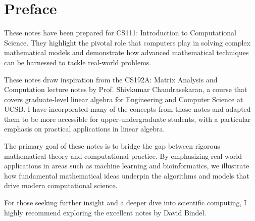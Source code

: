 \newpage
\section*{Preface}

\vskip 5mm
These notes have been prepared for CS111: Introduction to Computational Science. They highlight the pivotal role that computers play in solving complex mathematical models and demonstrate how advanced mathematical techniques can be harnessed to tackle real-world problems.

\vskip 5mm
These notes draw inspiration from the CS192A: Matrix Analysis and Computation lecture notes by Prof. Shivkumar Chandrasekaran, a course that covers graduate-level linear algebra for Engineering and Computer Science at UCSB. I have incorporated many of the concepts from those notes and adapted them to be more accessible for upper-undergraduate students, with a particular emphasis on practical applications in linear algebra.

\vskip 5mm
The primary goal of these notes is to bridge the gap between rigorous mathematical theory and computational practice. By emphasizing real-world applications in areas such as machine learning and bioinformatics, we illustrate how fundamental mathematical ideas underpin the algorithms and models that drive modern computational science.

\vskip 5mm
For those seeking further insight and a deeper dive into scientific computing, I highly recommend exploring the excellent notes by David Bindel.

